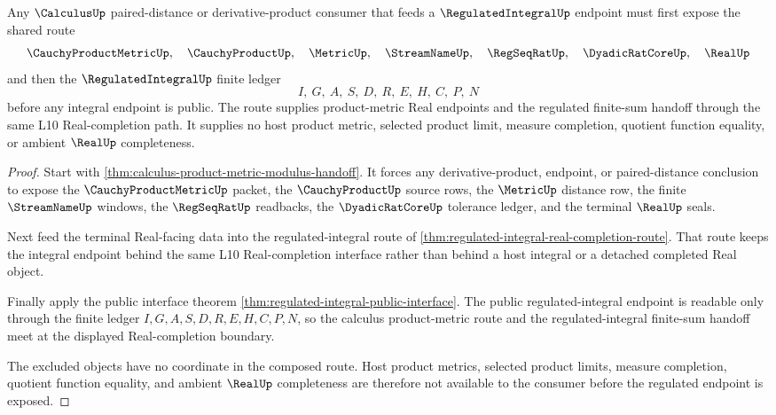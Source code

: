 \begin{theorem}
\label{thm:calculus-product-metric-regulated-integral-handoff}
Any $\CalculusUp$ paired-distance or derivative-product consumer that feeds a $\RegulatedIntegralUp$ endpoint must first expose the shared route
$$
\CauchyProductMetricUp,\quad
\CauchyProductUp,\quad
\MetricUp,\quad
\StreamNameUp,\quad
\RegSeqRatUp,\quad
\DyadicRatCoreUp,\quad
\RealUp
$$
and then the $\RegulatedIntegralUp$ finite ledger
$$
I,\ G,\ A,\ S,\ D,\ R,\ E,\ H,\ C,\ P,\ N
$$
before any integral endpoint is public. The route supplies product-metric Real endpoints and the regulated finite-sum handoff through the same L10 Real-completion path. It supplies no host product metric, selected product limit, measure completion, quotient function equality, or ambient $\RealUp$ completeness.
\end{theorem}
\begin{proof}
Start with \autoref{thm:calculus-product-metric-modulus-handoff}. It forces any derivative-product, endpoint, or paired-distance conclusion to expose the $\CauchyProductMetricUp$ packet, the $\CauchyProductUp$ source rows, the $\MetricUp$ distance row, the finite $\StreamNameUp$ windows, the $\RegSeqRatUp$ readbacks, the $\DyadicRatCoreUp$ tolerance ledger, and the terminal $\RealUp$ seals.

Next feed the terminal Real-facing data into the regulated-integral route of \autoref{thm:regulated-integral-real-completion-route}. That route keeps the integral endpoint behind the same L10 Real-completion interface rather than behind a host integral or a detached completed Real object.

Finally apply the public interface theorem \autoref{thm:regulated-integral-public-interface}. The public regulated-integral endpoint is readable only through the finite ledger $I,G,A,S,D,R,E,H,C,P,N$, so the calculus product-metric route and the regulated-integral finite-sum handoff meet at the displayed Real-completion boundary.

The excluded objects have no coordinate in the composed route. Host product metrics, selected product limits, measure completion, quotient function equality, and ambient $\RealUp$ completeness are therefore not available to the consumer before the regulated endpoint is exposed.
\end{proof}

